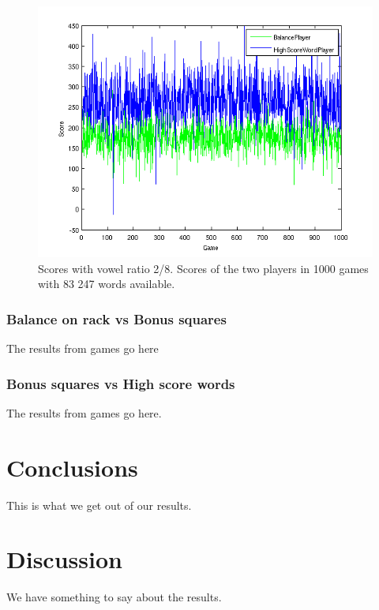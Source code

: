 \documentclass[a4paper, 12pt]{report}
\begin{document}
\begin{figure}
\centering
\includegraphics[scale=0.5]{High_Balance2pen2vow_1000games_smallDict}
\caption {Scores with vowel ratio 2/8. Scores of the two players in 1000 games with 83 247 words available.}
\label{fig:largeDict}
\end{figure}

\subsection{Balance on rack vs Bonus squares}
The results from games go here

\subsection{Bonus squares vs High score words}
The results from games go here.




\chapter{Conclusions}
This is what we get out of our results.







\chapter{Discussion}
We have something to say about the results.
\end{document}
